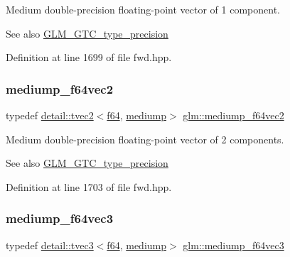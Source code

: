 Medium double-\/precision floating-\/point vector of 1 component. \begin{DoxySeeAlso}{See also}
\hyperlink{group__gtc__type__precision}{G\+L\+M\+\_\+\+G\+T\+C\+\_\+type\+\_\+precision} 
\end{DoxySeeAlso}


Definition at line 1699 of file fwd.\+hpp.

\mbox{\label{group__gtc__type__precision_ga892891863b8e50195e3e48077a329335}} 
\subsubsection{\texorpdfstring{mediump\+\_\+f64vec2}{mediump\_f64vec2}}
{\footnotesize\ttfamily typedef \hyperlink{structglm_1_1detail_1_1tvec2}{detail\+::tvec2}$<$\hyperlink{group__gtc__type__precision_ga2bba392e555124b36cde6abba349bab3}{f64}, \hyperlink{namespaceglm_a0f04f086094c747d227af4425893f545a6416f3ea0c9025fb21ed50c4d6620482}{mediump}$>$ \hyperlink{group__gtc__type__precision_ga892891863b8e50195e3e48077a329335}{glm\+::mediump\+\_\+f64vec2}}

Medium double-\/precision floating-\/point vector of 2 components. \begin{DoxySeeAlso}{See also}
\hyperlink{group__gtc__type__precision}{G\+L\+M\+\_\+\+G\+T\+C\+\_\+type\+\_\+precision} 
\end{DoxySeeAlso}


Definition at line 1703 of file fwd.\+hpp.

\mbox{\label{group__gtc__type__precision_gae2832f9acbf0cc1071fcf93336db6e0c}} 
\subsubsection{\texorpdfstring{mediump\+\_\+f64vec3}{mediump\_f64vec3}}
{\footnotesize\ttfamily typedef \hyperlink{structglm_1_1detail_1_1tvec3}{detail\+::tvec3}$<$\hyperlink{group__gtc__type__precision_ga2bba392e555124b36cde6abba349bab3}{f64}, \hyperlink{namespaceglm_a0f04f086094c747d227af4425893f545a6416f3ea0c9025fb21ed50c4d6620482}{mediump}$>$ \hyperlink{group__gtc__type__precision_gae2832f9acbf0cc1071fcf93336db6e0c}{glm\+::mediump\+\_\+f64vec3}}

